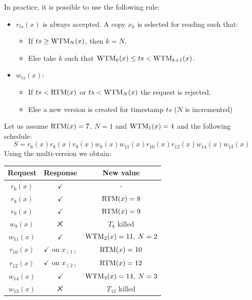 \documentclass[12pt, a4paper]{report}
\begin{document}
    In practice, it is possible to use the following rule: 
    \begin{itemize}
        \item $r_{ts}(x)$ is always accepted. A copy $x_k$ is selected for reading such that:
            \begin{itemize}
                \item If $ts \geq \textnormal{WTM}_N(x)$, then $k=N$. 
                \item Else take $k$ such that $\textnormal{WTM}_k(x) \leq ts < \textnormal{WTM}_{k+1}(x)$. 
            \end{itemize}
        \item $w_{ts}(x)$:
            \begin{itemize}
                \item If $ts < \textnormal{RTM}(x)$ or $ts < \textnormal{WTM}_N(x)$ the request is rejected. 
                \item Else a new version is created for timestamp $ts$ ($N$ is incremented)
            \end{itemize}
    \end{itemize}
    \begin{example}
        Let us assume $\textnormal{RTM}(x)=7$, $N=1$ and $\textnormal{WTM}_1(x)=4$ and the following schedule: 
        \[S=r_6(x) r_8(x) r_9(x) w_8(x) w_{11}(x) r_{10}(x) r_{12}(x) w_{14}(x) w_{13}(x)\]
        Using the multi-version we obtain: 
        \begin{table}[H]
            \centering
            \begin{tabular}{ccc}
            \textbf{Request} & \textbf{Response}         & \textbf{New value}  \\ \hline
            $r_6(x)$         & $\checkmark$              & -                   \\
            $r_8(x)$         & $\checkmark$              & $\textnormal{RTM}(x)=8$          \\
            $r_9(x)$         & $\checkmark$              & $\textnormal{RTM}(x)=9$          \\
            $w_8(x)$         & $\tikzxmark$              & $T_8$ killed        \\
            $w_{11}(x)$      & $\checkmark$              & $\textnormal{WTM}_2(x)=11,\:N=2$ \\
            $r_{10}(x)$      & $\checkmark$ on $x_{(1)}$ & $\textnormal{RTM}(x)=10$         \\
            $r_{12}(x)$      & $\checkmark$ on $x_{(2)}$ & $\textnormal{RTM}(x)=12$         \\
            $w_{14}(x)$      & $\checkmark$              & $\textnormal{WTM}_3(x)=14,\:N=3$ \\
            $w_{13}(x)$      & $\tikzxmark$              & $T_{13}$ killed
            \end{tabular}
        \end{table}
    \end{example}
\end{document}
